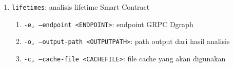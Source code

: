 \begin{enumerate}
\begin{enumerate}
\begin{enumerate}
			            \item \texttt{--cosine-threshold <COSINE\textunderscore THRESHOLD>}: ambang batas minimum kesamaan cosine (0.0-1.0) di atas mana kesamaan akan disimpan
			            \item \texttt{--ngram-length <NGRAM\textunderscore LENGTH>}: panjang N-gram yang digunakan untuk kesamaan cosine
		            \end{enumerate}
		      \item \texttt{lifetimes}: analisis lifetime Smart Contract
		            \begin{enumerate}
			            \item \texttt{-e, --endpoint <ENDPOINT>}: endpoint GRPC Dgraph
			            \item \texttt{-o, --output-path <OUTPUT\textunderscore PATH>}: path output dari hasil analisis
			            \item \texttt{-c, --cache-file <CACHE\textunderscore FILE>}: file cache yang akan digunakan
		            \end{enumerate}
	      \end{enumerate}
\end{enumerate}
